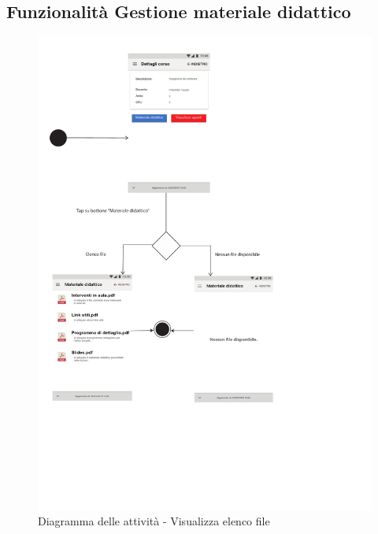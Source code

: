 \subsection{Funzionalità Gestione materiale didattico}
\begin{figure} [h]
	\centering
	\includegraphics[width=6in]{imgs/gruppo1/activity_diagrams/AD13_viasualizza_elenco_file.pdf}
	\caption{Diagramma delle attività - Visualizza elenco file}
	\label{diag:visualizzaElencoFileAD}
\end{figure}
\newpage

